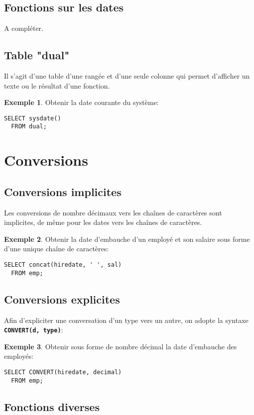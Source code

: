 \documentclass[a4paper, 12pt]{report}
\newcommand{\textSQL}[1]{\texttt{\textbf{#1}}}
\theoremstyle{definition} \newtheorem{ex}{Exemple}
\begin{document}
\subsection{Fonctions sur les dates}
A compléter.

\subsection{Table "dual"}
Il s'agit d'une table d'une rangée et d'une seule colonne qui permet d'afficher un texte ou le résultat d'une fonction.
\begin{ex}
Obtenir la date courante du système:
	\begin{lstlisting}[frame=single]
 SELECT sysdate() 
  FROM dual;
\end{lstlisting}
\end{ex}

\section{Conversions}
\subsection{Conversions implicites}
Les conversions de nombre décimaux vers les chaînes de caractères sont implicites, de même pour les dates vers les chaînes de caractères.
\begin{ex}
Obtenir la date d'embauche d'un employé et son salaire sous forme d'une unique chaîne de caractères:
	\begin{lstlisting}[frame=single]
 SELECT concat(hiredate, ' ', sal)
  FROM emp;
\end{lstlisting}
\end{ex}

\subsection{Conversions explicites}
Afin d'expliciter une conversation d'un type vers un autre, on adopte la syntaxe \textSQL{CONVERT(d, type)}:
	\begin{ex}
Obtenir sous forme de nombre décimal la date d'embauche des employés:
	\begin{lstlisting}[frame=single]
 SELECT CONVERT(hiredate, decimal)
  FROM emp;
\end{lstlisting}
\end{ex}

\subsection{Fonctions diverses}
\end{document}

